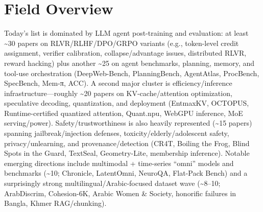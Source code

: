 \documentclass[12pt,letterpaper]{article}
\begin{document}
\medskip



\section*{Field Overview}
{\footnotesize Today's list is dominated by LLM agent post-training and evaluation: at least \textasciitilde{}30 papers on RLVR/RLHF/DPO/GRPO variants (e.g., token-level credit assignment, verifier calibration, collapse/advantage issues, distributed RLVR, reward hacking) plus another \textasciitilde{}25 on agent benchmarks, planning, memory, and tool-use orchestration (DeepWeb-Bench, PlanningBench, AgentAtlas, ProcBench, SpecBench, Mem-π, ACC). A second major cluster is efficiency/inference infrastructure---roughly \textasciitilde{}20 papers on KV-cache/attention optimization, speculative decoding, quantization, and deployment (EntmaxKV, OCTOPUS, Runtime-certified quantized attention, Quant.npu, WebGPU inference, MoE serving/power). Safety/trustworthiness is also heavily represented (\textasciitilde{}15 papers) spanning jailbreak/injection defenses, toxicity/elderly/adolescent safety, privacy/unlearning, and provenance/detection (CR4T, Boiling the Frog, Blind Spots in the Guard, TextSeal, Geometry-Lite, membership inference). Notable emerging directions include multimodal + time-series ``omni'' models and benchmarks (\textasciitilde{}10; Chronicle, LatentOmni, NeuroQA, Flat-Pack Bench) and a surprisingly strong multilingual/Arabic-focused dataset wave (\textasciitilde{}8--10; ArabDiscrim, Cohesion-6K, Arabic Women \& Society, honorific failures in Bangla, Khmer RAG/chunking).}
\end{document}
